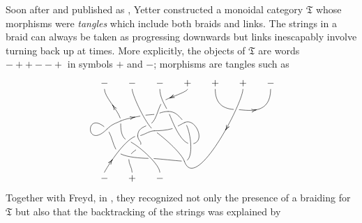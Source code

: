 \documentclass[a4paper,12pt]{article}
\theoremstyle{step}
\begin{document}
Soon after and published as \cite{Yetter1988}, Yetter constructed a monoidal category $\mathfrak{T}$ whose morphisms were {\em tangles} which include both braids and links. The strings in a braid can always be taken as progressing downwards but links inescapably involve turning back up at times.  More explicitly, the objects of $\mathfrak{T}$ are words $- + + - - +$ in symbols $+$ and $-$; morphisms are tangles such as
 \[
\xy
(0,20)*+!D{-}="t1";(10,20)*+!D{-}="t2";(20,20)*+!D{-}="t3";
(30,20)*+!D{+}="t4";(40,20)*+!D{+}="t5"; (50,20)*+!D{+}="t6";(60,20)*+!D{-}="t7";
(0,-10)*+!U{-}="b1";(10,-10)*+!U{+}="b2";(20,-10)*+!U{-}="b3";
"t3"+(3,-8)="a";
"t2"+(8,-15)="c";
"t3";"a"*{\hole} **\crv{"t3"+(0,-3)&"a"+(-1,2)} \POS?(.5)="b";
"t4";"b"*{\hole} **\crv{"t4"+(0,-1)&"b"+(1,1)} \POS?(.7)*\dir{>};
"t2";"c"*{\hole} **\crv{"t2"+(0,-2)&"c"+(-3,2)} \POS?(.8)="d" \POS?(.6)="e";
"b"*{\hole};"d"*{\hole} **\crv{"b"-(2,2)&"d"+(3,1)} \POS?(.5)="f";
"e"*{\hole};"f"*{\hole} **\crv{"f"};
"f"*{\hole};"a" **\crv{"f"&"a"+(-2,0)};
"e"+(-8,-2)="g";
"e"*{\hole};"g" **\crv{"e"+(1,0)&"g"+(2,1)} \POS?(.5)*\dir{<};
"t1";"g"*{\hole} **\crv{"t1"+(0,-3)&"g"+(0,3)} \POS?(.5)*\dir{<};
"d"+(-4,-4)="h";
"h"*{\hole};"b1" **\crv{"h"+(-4,0)&"b1"+(1,2)} \POS?(.5)="j" \POS?(.25)="k" \POS?(.65)*\dir{<};
"h"*{\hole};"c" **\crv{"h"+(2,0)&"c"+(-2,0)};
"d"*{\hole};"h" **\crv{"d"-(3,1)&"h"+(0,2)};
"g";"g"+(-5,-3)="i" **\crv{"g"+(-2,-1)&"i"+(2,2)};
"i";"i"*{\hole} **\crv{"i"-(8,8)&"i"+(-8,8)};
"i"*{\hole};"j"*{\hole} **\crv{"i"+(2,-2)&"j"+(-2,2)};
"g"*{\hole};"k"*{\hole} **\crv{"g"-(0,2)&"k"+(-3,1)};
"k"*{\hole};"b3" **\crv{"k"+(3,-1)&"b3"+(0,3)} \POS?(.3)="m" \POS?(.6)="l";
"j"*{\hole};"l"*{\hole} **\crv{"j"+(2,-2)&"l"+(-3,0)} \POS?(.4)="n";
"h";"m"*{\hole} **\crv{"h"-(0,2)&"m"+(2,2)};
"m"*{\hole};"n"*{\hole} **\crv{"m"-(2,2)&"n"+(1,2)};
"n"*{\hole};"b2" **\crv{"n"-(1,2)&"b2"+(0,2)};
"l"+(12,-1)="o";
"l"*{\hole};"o"*{\hole} **\crv{"l"+(2,0)&"o"+(-2,0)};
"c"*{\hole};"o" **\crv{"c"-(-3,2)&"o"+(-1,3)};
"o";"t6" **\crv{"o"+(4,-12)&"t6"-(0,5)} \POS?(.6)*\dir{<};
"a"+(6,-4)="p";
"a";"p"*{\hole} **\crv{"a"+(3,0)&"p"+(-2,2)};
"p"*{\hole};"o"*{\hole} **\crv{"p"+(2,-2)&"o"+(4,0)} \POS?(.5)="q";
"a"*{\hole};"q"*{\hole} **\crv{"a"+(1,-2)&"q"+(-4,0)} \POS?(.45)="r";
"q"*{\hole};"p" **\crv{"q"+(6,0)&"p"+(4,2)};
"p";"r"*{\hole} **\crv{"p"-(2,1)&"r"+(2,1)};
"r"*{\hole};"c" **\crv{"r"-(2,1)&"c"+(2,0)};
"t5";"t7" **i\crv{"t5"+(0,-10)&"t7"+(0,-10)} \POS?(.42)="s";
"t5";"s"*{\hole} **\crv{"t5"+(0,-5)&"s"-(5,0)};
"s"*{\hole};"t7" **\crv{"s"+(3,0)&"t7"+(0,-10)} \POS?(.5)*\dir{>}
\endxy
\]
Together with Freyd, in \cite{FreydYetter1989}, they recognized not only the presence of a braiding for $\mathfrak{T}$ but also that the backtracking of the strings was explained by
\end{document}
